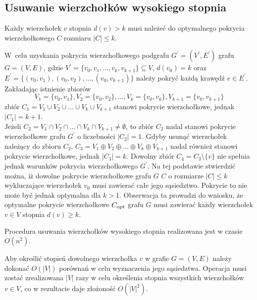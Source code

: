 \subsection{Usuwanie wierzchołków wysokiego stopnia}\label{section_kernelization_high-degree}

\begin{theorem}
  Każdy wierzchołek $v$ stopnia $d(v) > k$ musi należeć do optymalnego pokrycia wierzchołkowego 
  $C$ rozmiaru $|C| \leq k$.
\end{theorem}
\begin{bproof}
  W~celu uzyskania pokrycia wierzchołkowego podgrafu $G^\prime=(V^\prime,E^\prime)$
  grafu $G=(V,E)$, gdzie $V^\prime=\{v_0, v_1, \ldots, v_k, v_{k+1}\} \subseteq V$, $d(v_0)=k$ oraz \\
  $E^\prime=\{(v_0,v_1), (v_0,v_2), \ldots, (v_0,v_{k+1})\}$ należy pokryć każdą krawędź $e \in E^\prime$.
  Zakładając istnienie zbiorów \[V_1=\{v_0,v_1\}, V_2=\{v_0,v_2\}, \ldots,
  V_k=\{v_0,v_k\},V_{k+1}=\{v_0,v_{k+1}\}\]
  zbiór $C_1=V_1 \cup V_2 \cup \ldots \cup V_k \cup V_{k+1}$ stanowi pokrycie wierzchołkowe, jednak $|C_1| = k +1$.\\
  Jeżeli $C_2=V_1 \cap V_2 \cap \ldots \cap V_k \cap V_{k+1} \neq \emptyset$, to zbiór $C_2$ nadal stanowi pokrycie wierzchołkowe grafu $G^\prime$ o liczebności
  $|C_2|=1$.
  Gdyby usunąć wierzchołek należący do zbioru $C_2$, $C_3=V_1 \oplus V_2 \oplus \ldots \oplus V_k \oplus V_{k+1}$ nadal
  również stanowi pokrycie wierzchołkowe, jednak $|C_3|=k$.
  Dowolny zbiór $C_4=C_3 \setminus \{v\}$ nie spełnia jednak warunków pokrycia wierzchołkowego $G^\prime$.
  Na tej podstawie stwierdzić można, iż dowolne pokrycie wierzchołkowe grafu $G$ 
  $C$ o rozmiarze $|C| \leq k$ wykluczające wierzchołek $v_0$ musi zawierać całe jego
  sąsiedztwo. Pokrycie to nie może być jednak optymalna dla $k > 1$.
  Obserwacja ta prowadzi do wniosku, że optymalne pokrycie wierzchołkowe
  $C_{\textnormal{opt}}$ grafu $G$ musi zawierać każdy wierzchołek $v \in V$ stopnia $d(v) \geq k$.
\end{bproof}

\begin{theorem}
  Procedura usuwania wierzchołków wysokiego stopnia realizowana jest w czasie $O(n^2)$.
\end{theorem}
\begin{bproof}
  Aby określić stopień dowolnego wierzchołka $v$ w grafie $G=(V,E)$ należy 
  dokonać $O(|V|)$ porównań w celu wyznaczenia jego sąsiedztwa.
  Operacja musi zostać zrealizowana $|V|$ razy w celu określenia stopnia
  wszystkich wierzchołków $v \in V$, co w rezultacie daje złożoność $O (|V|^2)$.
\end{bproof}

